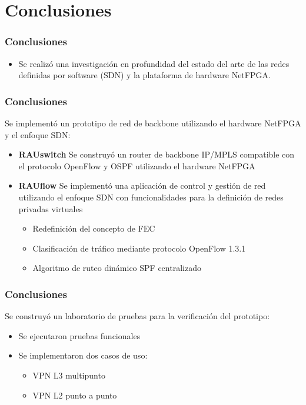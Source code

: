 \documentclass{beamer}
\begin{document}
\section{Conclusiones} 
\frame{\tableofcontents[currentsection]}

\begin{frame}
\frametitle{Conclusiones} 

\begin{itemize}
\item Se realiz\'o una investigaci\'on en profundidad del estado del arte de las redes definidas por software (SDN) y la plataforma de hardware NetFPGA.
\end{itemize}
\end{frame}

\begin{frame}
\frametitle{Conclusiones} 

Se implement\'o un prototipo de red de backbone utilizando el hardware NetFPGA y el enfoque SDN:

\pause
\begin{itemize}[<+->]
\item \textbf{RAUswitch} Se construy\'o un router de backbone IP/MPLS compatible con el protocolo OpenFlow y OSPF utilizando el hardware NetFPGA

\item \textbf{RAUflow} Se implement\'o una aplicaci\'on de control y gesti\'on de red utilizando el enfoque SDN con funcionalidades para la definici\'on de redes privadas virtuales

\begin{itemize}
\item Redefinici\'on del concepto de FEC
\item Clasificaci\'on de tr\'afico mediante protocolo OpenFlow 1.3.1
\item Algoritmo de ruteo din\'amico SPF centralizado
\end{itemize}
\end{itemize}

\end{frame}

\begin{frame}
\frametitle{Conclusiones} 

Se construy\'o un laboratorio de pruebas para la verificaci\'on del prototipo:

\pause
\begin{itemize}[<+->]
\item Se ejecutaron pruebas funcionales

\item Se implementaron dos casos de uso:
\begin{itemize}
\item VPN L3 multipunto
\item VPN L2 punto a punto
\end{itemize}

\end{itemize}

\end{frame}
\end{document}
